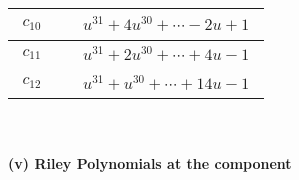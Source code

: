\documentclass[1p]{elsarticle_modified}
\theoremstyle{definition}
\begin{document}
\begin{tabular}{m{50pt}|m{274pt}}
\hline $$\begin{aligned}c_{10}\end{aligned}$$&$\begin{aligned}
&u^{31}+4 u^{30}+\cdots-2 u+1
\end{aligned}$\\
\hline $$\begin{aligned}c_{11}\end{aligned}$$&$\begin{aligned}
&u^{31}+2 u^{30}+\cdots+4 u-1
\end{aligned}$\\
\hline $$\begin{aligned}c_{12}\end{aligned}$$&$\begin{aligned}
&u^{31}+u^{30}+\cdots+14 u-1
\end{aligned}$\\
\hline
\end{tabular}\\~\\
\newpage\renewcommand{\arraystretch}{1}
\flushleft \textbf{(v) Riley Polynomials at the component}\newline \\
\end{document}
